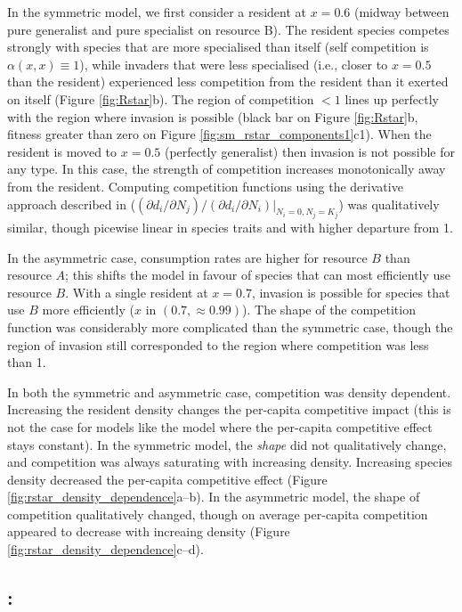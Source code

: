 \documentclass[a4paper,11pt]{article}
\begin{document}
In the symmetric model, we first consider a resident at $x = 0.6$
(midway between pure generalist and pure specialist on resource B).
%
The resident species competes strongly with species that are more
specialised than itself (self competition is $\alpha(x, x) \equiv
1$), while invaders that were less specialised (i.e., closer to $x =
0.5$ than the resident) experienced less competition from the resident
than it exerted on itself (Figure \ref{fig:Rstar}b).
%
The region of competition $< 1$ lines up perfectly with the region
where invasion is possible (black bar on Figure \ref{fig:Rstar}b,
fitness greater than zero on Figure
\ref{fig:sm_rstar_components1}c1).
%
When the resident is moved to $x = 0.5$ (perfectly generalist) then
invasion is not possible for any type.  In this case, the strength of
competition increases monotonically away from the resident.
%
Computing competition functions using the derivative approach
described in \citet{Abrams-2008}
($(\partial d_i / \partial N_j) / (\partial d_i / \partial N_i) |_{N_i
  = 0, N_j = K_j}$)
was qualitatively similar, though picewise linear in species traits
and with higher departure from 1.

In the asymmetric case, consumption rates are higher for
resource $B$ than resource $A$; this shifts the model in favour of
species that can most efficiently use resource $B$.
%
With a single resident at $x = 0.7$, invasion is possible for species
that use $B$ more efficiently ($x$ in $(0.7, \approx 0.99)$).
%
The shape of the competition function was considerably more
complicated than the symmetric case, though the region of invasion
still corresponded to the region where competition was less than 1.

In both the symmetric and asymmetric case, competition was density
dependent.  Increasing the resident density changes the per-capita
competitive impact (this is not the case for models like the
\citet{Dieckmann-1999} model where the per-capita competitive effect
stays constant).
%
In the symmetric model, the \emph{shape} did not qualitatively change,
and competition was always saturating with increasing density.
Increasing species density decreased the per-capita competitive effect
(Figure \ref{fig:rstar_density_dependence}a--b).
%
In the asymmetric model, the shape of competition qualitatively
changed, though on average per-capita competition appeared to decrease
with increaing density (Figure
\ref{fig:rstar_density_dependence}c--d).

\subsection{\plant: \hmat}
\end{document}
